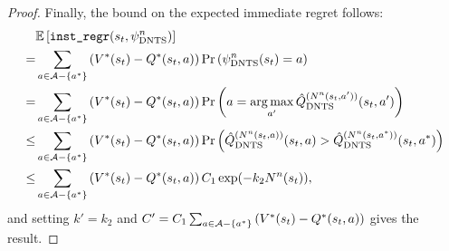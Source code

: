 \begin{proof}
        Finally, the bound on the expected immediate regret follows:
        \begin{align}
            & \mathbb{E}\left[ {\textnormal{\texttt{inst\_regr}}}(s_t,{\psi^{n}_{{\textnormal{DNTS}}}}) \right]  \\
                =& \sum_{a\in\mathcal{A}-\{a^*\}} 
                    \left(V^*(s_t)-Q^*(s_t,a)\right) \Pr\left({\psi^{n}_{{\textnormal{DNTS}}}}(s_t) =a \right) \\
                =& \sum_{a\in\mathcal{A}-\{a^*\}} 
                    \left(V^*(s_t)-Q^*(s_t,a)\right) \Pr\left(a = \operatorname*{arg\,max}_{a'} {\hat{Q}^{(N^n(s_t,a'))}_{{\textnormal{DNTS}}}}(s_t,a') \right) \\
                \leq& \sum_{a\in\mathcal{A}-\{a^*\}} 
                    \left(V^*(s_t)-Q^*(s_t,a)\right) 
                    \Pr\left({\hat{Q}^{(N^n(s_t,a))}_{{\textnormal{DNTS}}}}(s_t,a) > {\hat{Q}^{(N^n(s_t,a^*))}_{{\textnormal{DNTS}}}}(s_t,a^*)  \right) \\
                \leq&  \sum_{a\in\mathcal{A}-\{a^*\}} 
                    \left(V^*(s_t)-Q^*(s_t,a)\right) C_1 \exp(-k_2N^n(s_t)),
        \end{align}
        and setting $k'=k_2$ and $C'=C_1\sum_{a\in\mathcal{A}-\{a^*\}} \left(V^*(s_t)-Q^*(s_t,a)\right)$ gives the result.
    \end{proof}


































